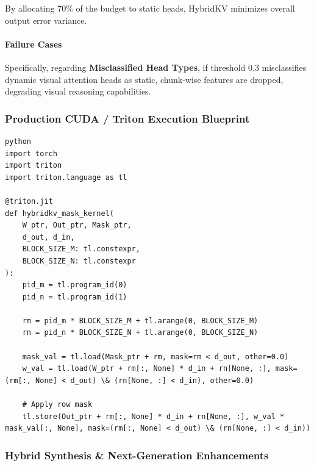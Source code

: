 By allocating $70\%$ of the budget to static heads, HybridKV minimizes overall output error variance.

\paragraph{Failure Cases}

Specifically, regarding \textbf{Misclassified Head Types}, if threshold $0.3$ misclassifies dynamic visual attention heads as static, chunk-wise features are dropped, degrading visual reasoning capabilities.



\subsubsection*{Production CUDA / Triton Execution Blueprint}

\vspace{0.5em}
\begin{mdframed}[backgroundcolor=codebg, linecolor=codeframe, linewidth=1pt, roundcorner=4pt, innerleftmargin=2pt, innerrightmargin=5pt, innertopmargin=5pt, innerbottommargin=5pt]
\begin{lstlisting}
python
import torch
import triton
import triton.language as tl

@triton.jit
def hybridkv_mask_kernel(
    W_ptr, Out_ptr, Mask_ptr,
    d_out, d_in,
    BLOCK_SIZE_M: tl.constexpr,
    BLOCK_SIZE_N: tl.constexpr
):
    pid_m = tl.program_id(0)
    pid_n = tl.program_id(1)

    rm = pid_m * BLOCK_SIZE_M + tl.arange(0, BLOCK_SIZE_M)
    rn = pid_n * BLOCK_SIZE_N + tl.arange(0, BLOCK_SIZE_N)

    mask_val = tl.load(Mask_ptr + rm, mask=rm < d_out, other=0.0)
    w_val = tl.load(W_ptr + rm[:, None] * d_in + rn[None, :], mask=(rm[:, None] < d_out) \& (rn[None, :] < d_in), other=0.0)

    # Apply row mask
    tl.store(Out_ptr + rm[:, None] * d_in + rn[None, :], w_val * mask_val[:, None], mask=(rm[:, None] < d_out) \& (rn[None, :] < d_in))
\end{lstlisting}
\end{mdframed}
\vspace{0.5em}


\subsubsection*{Hybrid Synthesis \& Next-Generation Enhancements}

